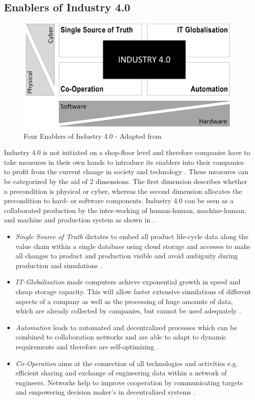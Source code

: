 \subsection{Enablers of Industry 4.0}
\begin{figure}[h!]
\includegraphics[scale=0.6]{./gfx/indus4enablers}
\centering
\caption{Four Enablers of Industry 4.0 - Adapted from \cite{IN4HYPO}}
\label{fig:2.1}
\end{figure}
Industry 4.0 is not initiated on a shop-floor level and therefore companies have to take measures in their own hands to introduce its enablers into their companies to profit from the current change in society and technology \cite{VDINACH}. 
These measures can be categorized by the aid of 2 dimensions. The first dimension describes whether a precondition is physical or cyber, whereas the second dimension allocates the precondition to hard- or software components. Industry 4.0 can be seen as a collaborated production by the inter-working of human-human, machine-human, and machine and production system as shown in  \cite{IN4HYPO}.
\begin{itemize}
\item \textit{Single Source of Truth} dictates to embed all product life-cycle data along the value chain within a single database using cloud storage and accesses to make all changes to product and production visible and avoid ambiguity during production and simulations \cite{IN4HYPO}.
\item \textit{\acs{IT}-Globalisation} made computers achieve exponential growth in speed and cheap storage capacity. This will allow faster extensive simulations of different aspects of a company as well as the processing of huge amounts of data, which are already collected by companies, but cannot be used adequately \cite{IN4HYPO}.
\item \textit{Automation} leads to automated and decentralized processes which can be combined to collaboration networks and are able to adapt to dynamic requirements and therefore are self-optimizing \cite{IN4HYPO}.
\item \textit{Co-Operation} aims at the connection of all technologies and activities e.g. efficient sharing and exchange of engineering data within a network of engineers. Networks help to improve cooperation by communicating targets and empowering decision maker’s in decentralized systems \cite{IN4HYPO,VDINACH}.
\end{itemize}
